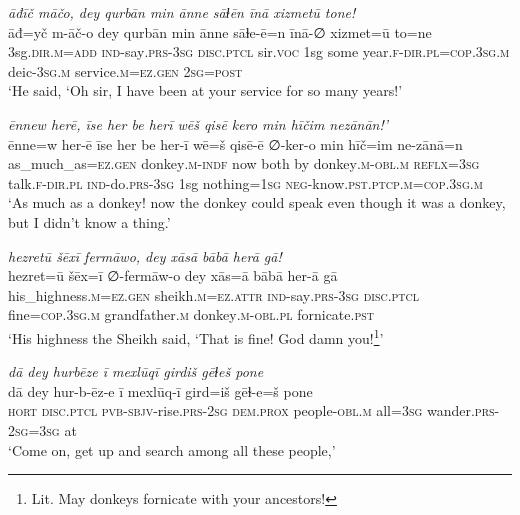 \ea \label{HB.82}
\textit{āđīč māčo, dey qurbān min ānne sāɫēn īnā xizmetū tone!} \\ 
\gll āđ=yč m-āč-o dey qurbān min ānne sāɫe-ē=n īnā-∅ xizmet=ū to=ne \\ 
 3sg\textsc{.dir}\textsc{.m}\textsc{=add} \textsc{ind-}say\textsc{.prs}\textsc{-3sg} \textsc{disc.ptcl} sir.\textsc{voc} 1sg some year\textsc{\textsc{.f}}\textsc{-dir}\textsc{.pl}\textsc{=cop}\textsc{.3sg}\textsc{.m} deic\textsc{-3sg}\textsc{.m} service\textsc{.m}\textsc{=ez}\textsc{.gen} \textsc{2sg}\textsc{=\textsc{post}} \\ 
\glt `He said, ‘Oh sir, I have been at your service for so many years!'
\z 
 
\ea \label{HB.84}
\textit{ēnnew herē, īse her be herī wēš qisē kero min hīčim nezānān!’} \\ 
\gll ēnne=w her-ē īse her be her-ī wē=š qisē-ē ∅-ker-o min hīč=im ne-zānā=n \\ 
 as\_much\_as\textsc{=ez}\textsc{.gen} donkey\textsc{.m}\textsc{-indf} now both by donkey\textsc{.m}\textsc{-obl}\textsc{.m} \textsc{reflx}\textsc{=3sg} talk\textsc{\textsc{.f}}\textsc{-dir}\textsc{.pl} \textsc{ind-}do\textsc{.prs}\textsc{-3sg} 1sg nothing\textsc{=1sg} \textsc{neg-}know\textsc{.pst}\textsc{.ptcp}\textsc{.m}\textsc{=cop}\textsc{.3sg}\textsc{.m} \\ 
\glt `As much as a donkey! now the donkey could speak even though it was a donkey, but I didn’t know a thing.'
\z 
 
\ea \label{HB.85}
\textit{hezretū šēxī fermāwo, dey xāsā bābā herā gā!} \\ 
\gll hezret=ū šēx=ī ∅-fermāw-o dey xās=ā bābā her-ā gā \\ 
 his\_highness\textsc{.m}\textsc{=ez}\textsc{.gen} sheikh\textsc{.m}\textsc{=ez}.\textsc{attr} \textsc{ind-}say\textsc{.prs}\textsc{-3sg} \textsc{disc.ptcl} fine\textsc{=cop}\textsc{.3sg}\textsc{.m} grandfather\textsc{.m} donkey\textsc{.m}\textsc{-obl}\textsc{.pl} fornicate\textsc{.pst} \\ 
\glt `His highness the Sheikh said, ‘That is fine! God damn you!\footnote{Lit. May donkeys fornicate with your ancestors!}'
\z 
 
\ea \label{HB.90}
\textit{dā dey hurbēze ī mexlūqī girdiš gēɫeš pone} \\ 
\gll dā dey hur-b-ēz-e ī mexlūq-ī gird=iš gēɫ-e=š pone \\ 
 \textsc{hort} \textsc{disc.ptcl} \textsc{pvb-}\textsc{sbjv-}rise\textsc{.prs}-\textsc{2sg} \textsc{dem.prox} people\textsc{-obl}\textsc{.m} all\textsc{=3sg} wander\textsc{.prs}-\textsc{2sg}\textsc{=3sg} at \\ 
\glt `Come on, get up and search among all these people,'
\z 
 

